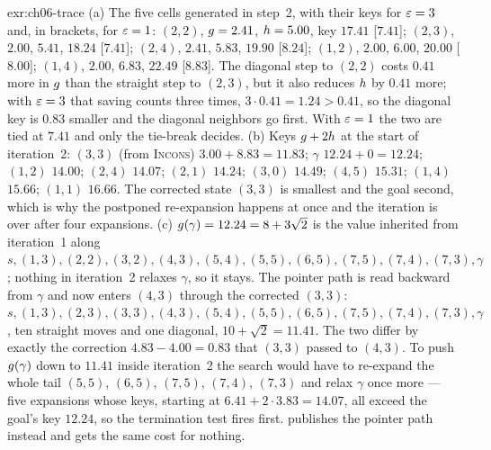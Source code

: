 
\begin{solution}{exr:ch06-trace}
(a) The five cells generated in step~2, with their keys for $\varepsilon = 3$ and, in brackets, for $\varepsilon = 1$: $(2,2)$, $g = 2.41$, $h = 5.00$, key $17.41$ [$7.41$]; $(2,3)$, $2.00$, $5.41$, $18.24$ [$7.41$]; $(2,4)$, $2.41$, $5.83$, $19.90$ [$8.24$]; $(1,2)$, $2.00$, $6.00$, $20.00$ [$8.00$]; $(1,4)$, $2.00$, $6.83$, $22.49$ [$8.83$]. The diagonal step to $(2,2)$ costs $0.41$ more in $g$ than the straight step to $(2,3)$, but it also reduces $h$ by $0.41$ more; with $\varepsilon = 3$ that saving counts three times, $3 \cdot 0.41 = 1.24 > 0.41$, so the diagonal key is $0.83$ smaller and the diagonal neighbors go first. With $\varepsilon = 1$ the two are tied at $7.41$ and only the tie-break decides. (b) Keys $g + 2h$ at the start of iteration~2: $(3,3)$ (from \textsc{Incons}) $3.00 + 8.83 = 11.83$; $\gamma$ $12.24 + 0 = 12.24$; $(1,2)$ $14.00$; $(2,4)$ $14.07$; $(2,1)$ $14.24$; $(3,0)$ $14.49$; $(4,5)$ $15.31$; $(1,4)$ $15.66$; $(1,1)$ $16.66$. The corrected state $(3,3)$ is smallest and the goal second, which is why the postponed re-expansion happens at once and the iteration is over after four expansions. (c) $g(\gamma) = 12.24 = 8 + 3\sqrt{2}$ is the value inherited from iteration~1 along $s, (1,3), (2,2), (3,2), (4,3), (5,4), (5,5), (6,5), (7,5), (7,4), (7,3), \gamma$; nothing in iteration~2 relaxes $\gamma$, so it stays. The pointer path is read backward from $\gamma$ and now enters $(4,3)$ through the corrected $(3,3)$: $s, (1,3), (2,3), (3,3), (4,3), (5,4), (5,5), (6,5), (7,5), (7,4), (7,3), \gamma$, ten straight moves and one diagonal, $10 + \sqrt{2} = 11.41$. The two differ by exactly the correction $4.83 - 4.00 = 0.83$ that $(3,3)$ passed to $(4,3)$. To push $g(\gamma)$ down to $11.41$ inside iteration~2 the search would have to re-expand the whole tail $(5,5)$, $(6,5)$, $(7,5)$, $(7,4)$, $(7,3)$ and relax $\gamma$ once more --- five expansions whose keys, starting at $6.41 + 2 \cdot 3.83 = 14.07$, all exceed the goal's key $12.24$, so the termination test fires first. \arastar publishes the pointer path instead and gets the same cost for nothing.
\end{solution}

